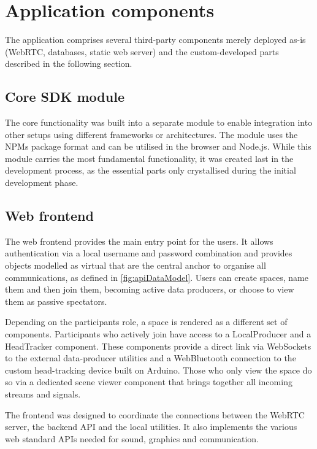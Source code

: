 \section{Application components}
\label{sec:application-components}

The application comprises several third-party components merely deployed as-is (WebRTC, databases, static web server) and the custom-developed parts described in the following section.

\subsection{Core SDK module}
\label{subsec:core-sdk-module}

The core functionality was built into a separate module to enable integration into other setups using different frameworks or architectures.
The module uses the \ac{NPM}\textquotesingle s package format and can be utilised in the browser and Node.js.
While this module carries the most fundamental functionality, it was created last in the development process, as the essential parts only crystallised during the initial development phase.

\subsection{Web frontend}
\label{subsec:web-frontend}

The web frontend provides the main entry point for the users.
It allows authentication via a local username and password combination and provides objects modelled as virtual  that are the central anchor to organise all communications, as defined in \autoref{fig:apiDataModel}.
Users can create spaces, name them and then join them, becoming active data producers, or choose to view them as passive spectators.

Depending on the participant\textquotesingle s role, a space is rendered as a different set of components.
Participants who actively join have access to a LocalProducer and a HeadTracker component.
These components provide a direct link via WebSockets to the external data-producer utilities and a WebBluetooth connection to the custom head-tracking device built on Arduino.
Those who only view the space do so via a dedicated scene viewer component that brings together all incoming streams and signals.

The frontend was designed to coordinate the connections between the WebRTC server, the backend \ac{API} and the local utilities.
It also implements the various web standard \ac{API}s needed for sound, graphics and communication.

